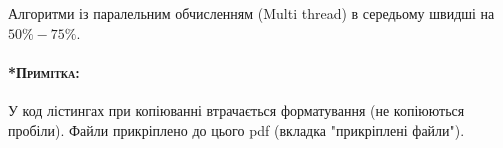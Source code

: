 \documentclass{udstu}
\begin{document}
\conclusions

Алгоритми із паралельним обчисленням (Multi thread) в середьому швидші на $50\% - 75\%$.


\paragraph{\textsc{*Примітка:}}
У код лістингах при копіюванні втрачається форматування (не копіюються пробіли).
Файли прикріплено до цього pdf (вкладка "прикріплені файли").

\inputminted{rust}{../src/matop.rs}

\inputminted{rust}{../src/lib.rs}

\inputminted{rust}{../src/main.rs}
\end{document}
